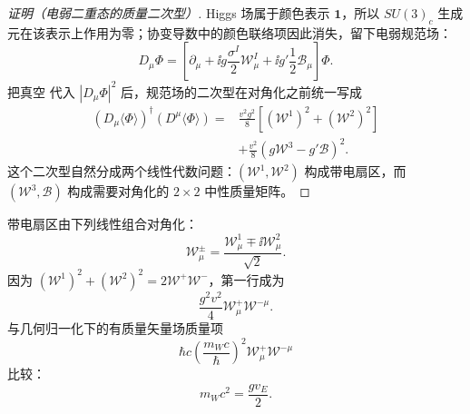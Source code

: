 \begin{proof}[证明（电弱二重态的质量二次型）]
Higgs 场属于颜色表示 $\mathbf1$，所以 $SU(3)_c$ 生成元在该表示上作用为零；协变导数中的颜色联络项因此消失，留下电弱规范场：
\begin{equation*}
 D_\mu\Phi
 =\left[
 \partial_\mu
 +\ii g\frac{\sigma^I}{2}\mathcal W_\mu^I
 +\ii g'\frac12\mathcal B_\mu
 \right]\Phi.
\end{equation*}
把真空 代入 $|D_\mu\Phi|^2$ 后，规范场的二次型在对角化之前统一写成
\begin{align}
 (D_\mu\langle\Phi\rangle)^\dagger(D^\mu\langle\Phi\rangle)
 =&\frac{v^2g^2}{8}\left[(\mathcal W^1)^2+(\mathcal W^2)^2\right]\\
 &+\frac{v^2}{8}(g\mathcal W^3-g'\mathcal B)^2.
 \label{eq:sm-gauge-mass-before-diagonal-dp11}
\end{align}
这个二次型自然分成两个线性代数问题：$(\mathcal W^1,\mathcal W^2)$ 构成带电扇区，而 $(\mathcal W^3,\mathcal B)$ 构成需要对角化的 $2\times2$ 中性质量矩阵。
\end{proof}

\begin{proposition}[带电规范场的质量]
带电扇区由下列线性组合对角化：
\begin{equation}
 \boxed{
 \mathcal W_\mu^\pm
 =\frac{\mathcal W_\mu^1\mp\ii\mathcal W_\mu^2}{\sqrt2}.}
 \label{eq:wpm-definition-dp11}
\end{equation}
因为 $(\mathcal W^1)^2+(\mathcal W^2)^2=2\mathcal W^+\mathcal W^-$，第一行成为
\begin{equation*}
 \frac{g^2v^2}{4}\mathcal W_\mu^+\mathcal W^{-\mu}.
\end{equation*}
与几何归一化下的有质量矢量场质量项
\begin{equation*}
 \hbar c\left(\frac{m_Wc}{\hbar}\right)^2
 \mathcal W_\mu^+\mathcal W^{-\mu}
\end{equation*}
比较：
\begin{equation}
 \boxed{m_Wc^2=\frac{gv_E}{2}.}
 \label{eq:sm-w-mass-dp11}
\end{equation}
\end{proposition}

